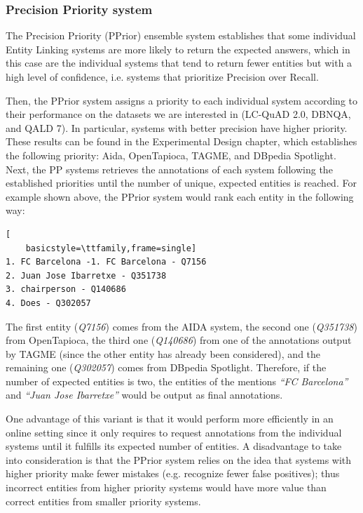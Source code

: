 \subsubsection{Precision Priority system}
\label{cap3:system/entLinModule/ensembleSystems/pprior}
The Precision Priority (PPrior) ensemble system establishes that some individual Entity 
Linking systems are more likely to return the expected answers, which in this case are the 
individual systems that tend to return fewer entities but with a high level of confidence, 
i.e. systems that prioritize Precision over Recall.

Then, the PPrior system assigns a priority to each individual system according to their 
performance on the datasets we are interested in (LC-QuAD 2.0, DBNQA, and QALD 7). In 
particular, systems with better precision have higher priority. These results can be found in 
the Experimental Design chapter, which establishes the following priority: Aida, OpenTapioca, 
TAGME, and DBpedia Spotlight. Next, the PP systems retrieves the annotations of each system 
following the established priorities until the number of unique, expected entities is reached. 
For example shown above, the PPrior system would rank each entity in the following way:

\begin{lstlisting}[
    basicstyle=\ttfamily,frame=single]
1. FC Barcelona -1. FC Barcelona - Q7156
2. Juan Jose Ibarretxe - Q351738
3. chairperson - Q140686
4. Does - Q302057     
\end{lstlisting}

The first entity (\textit{Q7156}) comes from the AIDA system, the second one (\textit{Q351738}) 
from OpenTapioca, the third one (\textit{Q140686}) from one of the annotations output by 
TAGME (since the other entity has already been considered), and the remaining one (\textit{Q302057}) 
comes from DBpedia Spotlight. Therefore, if the number of expected entities is two, the 
entities of the mentions \textit{“FC Barcelona”} and \textit{“Juan Jose Ibarretxe”} would be 
output as final annotations.

One advantage of this variant is that it would perform more efficiently in an online setting 
since it only requires to request annotations from the individual systems until it fulfills 
its expected number of entities. A disadvantage to take into consideration is that the PPrior 
system relies on the idea that systems with higher priority make fewer mistakes (e.g. 
recognize fewer false positives); thus incorrect entities from higher priority systems would 
have more value than correct entities from smaller priority systems.

